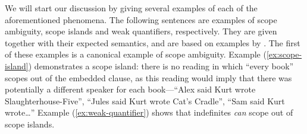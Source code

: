 \documentclass[10pt,a4paper]{llncs}
\begin{document}
We will start our discussion by giving several examples of each of the
aforementioned phenomena. The following sentences are examples of scope
ambiguity, scope islands and weak quantifiers, respectively. They are
given together with their expected semantics, and are based on
examples by \citet[][p.\ 608, 622]{szabolcsi2000}.
The first of these examples is a canonical example of scope
ambiguity.
%
Example (\ref{ex:scope-island}) demonstrates a scope
island: there is no reading in which ``every book'' scopes out of the
embedded clause, as this reading would imply that there was
potentially a different speaker for each book---``Alex said Kurt
wrote Slaughterhouse-Five'', ``Jules said Kurt wrote Cat's Cradle'',
``Sam said Kurt wrote\ldots''
%
Example (\ref{ex:weak-quantifier}) shows that indefinites \emph{can}
scope out of scope islands.
\end{document}
